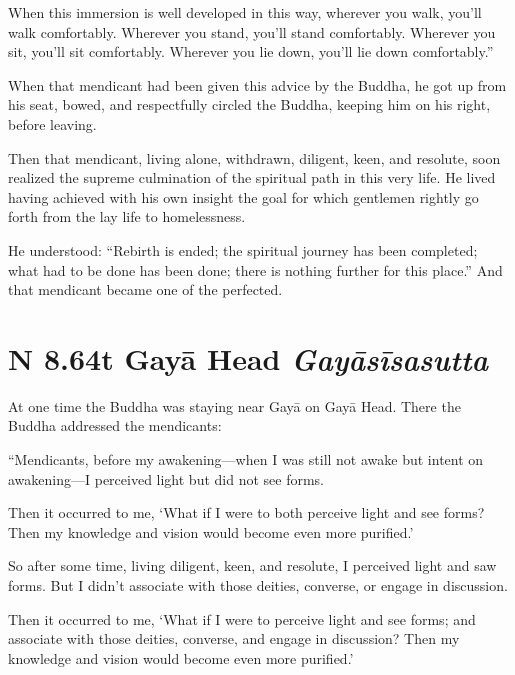 \documentclass[12pt,openany]{book}%
\newcommand*{\suttatitleacronym}[1]{\smaller[2]{#1}\vspace*{.3em}}
\newcommand*{\suttatitletranslation}[1]{\linebreak{#1}}
\newcommand*{\suttatitleroot}[1]{\linebreak\smaller[2]\itshape{#1}}
\newcommand*{\tocacronym}[1]{\hspace*{-3.3em}{#1}\quad}
\newcommand*{\toctranslation}[1]{#1}
\newcommand*{\tocroot}[1]{(\textit{#1})}
\begin{document}
When this immersion is well developed in this way, wherever you walk, you’ll walk comfortably. Wherever you stand, you’ll stand comfortably. Wherever you sit, you’ll sit comfortably. Wherever you lie down, you’ll lie down comfortably.” 

When that mendicant had been given this advice by the Buddha, he got up from his seat, bowed, and respectfully circled the Buddha, keeping him on his right, before leaving. 

Then that mendicant, living alone, withdrawn, diligent, keen, and resolute, soon realized the supreme culmination of the spiritual path in this very life. He lived having achieved with his own insight the goal for which gentlemen rightly go forth from the lay life to homelessness. 

He understood: “Rebirth is ended; the spiritual journey has been completed; what had to be done has been done; there is nothing further for this place.” And that mendicant became one of the perfected. 

%
\section*{{\suttatitleacronym AN 8.64}{\suttatitletranslation At Gayā Head }{\suttatitleroot Gayāsīsasutta}}
\addcontentsline{toc}{section}{\tocacronym{AN 8.64} \toctranslation{At Gayā Head } \tocroot{Gayāsīsasutta}}

At one time the Buddha was staying near \textsanskrit{Gayā} on \textsanskrit{Gayā} Head. There the Buddha addressed the mendicants: 

“Mendicants, before my awakening—when I was still not awake but intent on awakening—I perceived light but did not see forms. 

Then it occurred to me, ‘What if I were to both perceive light and see forms? Then my knowledge and vision would become even more purified.’ 

So after some time, living diligent, keen, and resolute, I perceived light and saw forms. But I didn’t associate with those deities, converse, or engage in discussion. 

Then it occurred to me, ‘What if I were to perceive light and see forms; and associate with those deities, converse, and engage in discussion? Then my knowledge and vision would become even more purified.’ 
\end{document}

